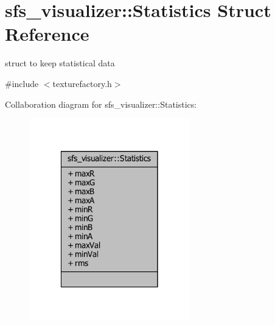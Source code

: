 \section{sfs\-\_\-visualizer\-:\-:Statistics Struct Reference}
\label{structsfs__visualizer_1_1Statistics}


struct to keep statistical data  




{\ttfamily \#include $<$texturefactory.\-h$>$}



Collaboration diagram for sfs\-\_\-visualizer\-:\-:Statistics\-:
\nopagebreak
\begin{figure}[H]
\begin{center}
\leavevmode
\includegraphics[width=198pt]{d5/d69/structsfs__visualizer_1_1Statistics__coll__graph}
\end{center}
\end{figure}
